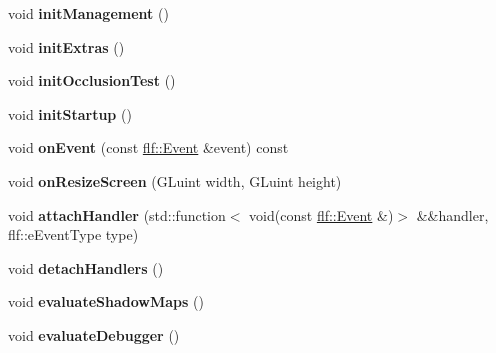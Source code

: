 \begin{DoxyCompactItemize}
void {\bfseries init\+Management} ()
\item 
\mbox{\label{structflw_1_1Engine_1_1EngineImpl_a3f2834886d469a2cc8f41692f14dc35c}} 
void {\bfseries init\+Extras} ()
\item 
\mbox{\label{structflw_1_1Engine_1_1EngineImpl_a456bc5da103eeda5bf9f3c16cb3f611a}} 
void {\bfseries init\+Occlusion\+Test} ()
\item 
\mbox{\label{structflw_1_1Engine_1_1EngineImpl_ae825010576455406f024bd1f63e247c0}} 
void {\bfseries init\+Startup} ()
\item 
\mbox{\label{structflw_1_1Engine_1_1EngineImpl_a156f1bd9cb49d379d955131594a5ac51}} 
void {\bfseries on\+Event} (const \hyperlink{classflw_1_1flf_1_1Event}{flf\+::\+Event} \&event) const
\item 
\mbox{\label{structflw_1_1Engine_1_1EngineImpl_adadc224e59aa5cbdf43d2ff3751a676a}} 
void {\bfseries on\+Resize\+Screen} (G\+Luint width, G\+Luint height)
\item 
\mbox{\label{structflw_1_1Engine_1_1EngineImpl_a37e2fc6aed38930f7620352c3da4952e}} 
void {\bfseries attach\+Handler} (std\+::function$<$ void(const \hyperlink{classflw_1_1flf_1_1Event}{flf\+::\+Event} \&)$>$ \&\&handler, flf\+::e\+Event\+Type type)
\item 
\mbox{\label{structflw_1_1Engine_1_1EngineImpl_a0860a693317e1bebaa607f6694f083f6}} 
void {\bfseries detach\+Handlers} ()
\item 
\mbox{\label{structflw_1_1Engine_1_1EngineImpl_a15b4df4f32dea9d6f177c1c7e6d5c07c}} 
void {\bfseries evaluate\+Shadow\+Maps} ()
\item 
\mbox{\label{structflw_1_1Engine_1_1EngineImpl_a91a3eb8c74c7ddb5dc8b6c61224d3a22}} 
void {\bfseries evaluate\+Debugger} ()
\item 
\mbox{\label{structflw_1_1Engine_1_1EngineImpl_aa7e908856cc0a5a3356c40c10091db64}} 

\end{DoxyCompactItemize}
